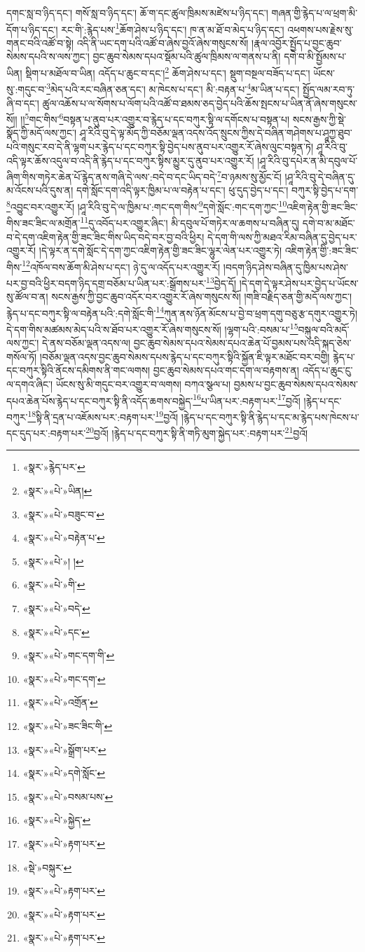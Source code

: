 དགང་སླ་བ་ཉིད་དང་། གསོ་སླ་བ་ཉིད་དང་། ཆོ་ག་དང་ཚུལ་ཁྲིམས་མཛེས་པ་ཉིད་དང་། གཞན་གྱི་རྙེད་པ་ལ་ཕྲག་མི་དོག་པ་ཉིད་དང་། རང་གི་:རྙེད་པས་\footnote{«སྣར་»རྙེད་པར་}ཆོག་ཤེས་པ་ཉིད་དང་། ཁ་ན་མ་ཐོ་བ་མེད་པ་ཉིད་དང་། འཕགས་པས་རྗེས་སུ་གནང་བའི་འཚོ་བ་སྟེ། འདི་ནི་ཡང་དག་པའི་འཚོ་བ་ཞེས་བྱའོ་ཞེས་གསུངས་སོ། །རྣལ་འབྱོར་སྤྱོད་པ་བྱང་ཆུབ་སེམས་དཔའི་ས་ལས་ཀྱང་། བྱང་ཆུབ་སེམས་དཔའ་སྡོམ་པའི་ཚུལ་ཁྲིམས་ལ་གནས་པ་ནི། དགེ་བ་མི་སྤྱོམས་པ་ཡིན། སྡིག་པ་མཐོལ་བ་ཡིན། འདོད་པ་ཆུང་བ་དང་།\footnote{«སྣར་»«པེ་»ཡིན།} ཆོག་ཤེས་པ་དང་། སྡུག་བསྔལ་བཟོད་པ་དང་། ཡོངས་སུ་:གདུང་བ་\footnote{«སྣར་»«པེ་»བཟུང་བ་}མེད་པའི་རང་བཞིན་ཅན་དང་། མ་ཁེངས་པ་དང་། མི་:བརྟན་པ་\footnote{«སྣར་»«པེ་»བརྟེན་པ་}མ་ཡིན་པ་དང་། སྤྱོད་ལམ་རབ་ཏུ་ཞི་བ་དང་། ཚུལ་འཆོས་པ་ལ་སོགས་པ་ལོག་པའི་འཚོ་བ་ཐམས་ཅད་བྱེད་པའི་ཆོས་སྤངས་པ་ཡིན་ནོ་ཞེས་གསུངས་སོ།། །།\footnote{«སྣར་»«པེ་»། །}གང་གིས་\footnote{«སྣར་»«པེ་»གི་}བསྟན་པ་ནུབ་པར་འགྱུར་བ་རྙེད་པ་དང་བཀུར་སྟི་ལ་དགོངས་པ་བསྟན་པ། སངས་རྒྱས་ཀྱི་སྡེ་སྣོད་ཀྱི་མདོ་ལས་ཀྱང་། ཤཱ་རིའི་བུ་དེ་ལྟ་མོད་ཀྱི་བཅོམ་ལྡན་འདས་འོད་སྲུངས་ཀྱིས་དེ་བཞིན་གཤེགས་པ་ཤཱཀྱ་ཐུབ་པའི་གསུང་རབ་དེ་ནི་ལྷག་པར་རྙེད་པ་དང་བཀུར་སྟི་བྱེད་པས་ནུབ་པར་འགྱུར་རོ་ཞེས་ལུང་བསྟན་ཏེ། ཤཱ་རིའི་བུ་འདི་ལྟར་ཆོས་འདུལ་བ་འདི་ནི་རྙེད་པ་དང་བཀུར་སྟིས་མྱུར་དུ་ནུབ་པར་འགྱུར་རོ། །ཤཱ་རིའི་བུ་དཔེར་ན་མི་དབུལ་པོ་ཞིག་གིས་གཏེར་ཆེན་པོ་རྙེད་ནས་གཞི་དེ་ལས་:བདེ་བ་དང་ཡིད་བདེ་\footnote{«སྣར་»«པེ་»བདེ་}བ་ཉམས་སུ་མྱོང་ངོ། །ཤཱ་རིའི་བུ་དེ་བཞིན་དུ་མ་འོངས་པའི་དུས་ན། དགེ་སློང་དག་འདི་ལྟར་ཁྱིམ་པ་ལ་བརྟེན་པ་དང་། ཕུ་དུད་བྱེད་པ་དང་། བཀུར་སྟི་བྱེད་པ་དག་\footnote{«སྣར་»«པེ་»དང་}འབྱུང་བར་འགྱུར་རོ། །ཤཱ་རིའི་བུ་དེ་ལ་ཁྱིམ་པ་:གང་དག་གིས་\footnote{«སྣར་»«པེ་»གང་དག་གི་}དགེ་སློང་:གང་དག་ཀྱང་\footnote{«སྣར་»«པེ་»གང་དག་}འཇིག་རྟེན་གྱི་ཟང་ཟིང་གིས་ཟང་ཟིང་ལ་མགྲོན་\footnote{«སྣར་»«པེ་»འགྲོན་}དུ་འབོད་པར་འགྱུར་ཞིང་། མི་དབུལ་པོ་གཏེར་ལ་ཆགས་པ་བཞིན་དུ། དགེ་བ་མ་མཐོང་བ་དེ་དག་འཇིག་རྟེན་གྱི་ཟང་ཟིང་གིས་ཡིད་བདེ་བར་བྱ་བའི་ཕྱིར། དེ་དག་གི་ལས་ཀྱི་མཐའ་རིམ་བཞིན་དུ་བྱེད་པར་འགྱུར་རོ། །དེ་ལྟར་ན་དགེ་སློང་དེ་དག་ཀྱང་འཇིག་རྟེན་གྱི་ཟང་ཟིང་ལྷུར་ལེན་པར་འགྱུར་ཏེ། འཇིག་རྟེན་གྱི་:ཟང་ཟིང་གིས་\footnote{«སྣར་»«པེ་»ཟང་ཟིང་གི་}འཁོལ་བས་ཆོག་མི་ཤེས་པ་དང་། ཉེ་དུ་ལ་འདོད་པར་འགྱུར་རོ། །བདག་ཉིད་ཤེས་བཞིན་དུ་ཁྱིམ་པས་ཤེས་པར་བྱ་བའི་ཕྱིར་བདག་ཉིད་དགྲ་བཅོམ་པ་ཡིན་པར་:སྒྲོགས་པར་\footnote{«སྣར་»«པེ་»སྒྲོག་པར་}བྱེད་དོ། །དེ་དག་དེ་ལྟར་ཤེས་པར་བྱེད་པ་ཡོངས་སུ་ཚོལ་བ་ན། སངས་རྒྱས་ཀྱི་བྱང་ཆུབ་འདོར་བར་འགྱུར་རོ་ཞེས་གསུངས་སོ། །གཟི་བརྗིད་ཅན་གྱི་མདོ་ལས་ཀྱང་། རྙེད་པ་དང་བཀུར་སྟི་ལ་བརྟེན་པའི་:དགེ་སློང་གི་\footnote{«སྣར་»«པེ་»དགེ་སློང་}ཀུན་ནས་ཉོན་མོངས་པ་བྱེ་བ་ཕྲག་དགུ་བཅུ་རྩ་དགུར་འགྱུར་ཏེ། དེ་དག་གིས་མཚམས་མེད་པའི་ས་ཐོབ་པར་འགྱུར་རོ་ཞེས་གསུངས་སོ། །ལྷག་པའི་:བསམ་པ་\footnote{«སྣར་»«པེ་»བསམ་པས་}བསྐུལ་བའི་མདོ་ལས་ཀྱང་། དེ་ནས་བཅོམ་ལྡན་འདས་ལ། བྱང་ཆུབ་སེམས་དཔའ་སེམས་དཔའ་ཆེན་པོ་བྱམས་པས་འདི་སྐད་ཅེས་གསོལ་ཏོ། །བཅོམ་ལྡན་འདས་བྱང་ཆུབ་སེམས་དཔས་རྙེད་པ་དང་བཀུར་སྟིའི་སྐྱོན་ཇི་ལྟར་མཐོང་བར་བགྱི། རྙེད་པ་དང་བཀུར་སྟིའི་ནོངས་དམིགས་ནི་གང་ལགས། བྱང་ཆུབ་སེམས་དཔའ་གང་དག་ལ་བརྟགས་ན། འདོད་པ་ཆུང་ངུ་ལ་དགའ་ཞིང་། ཡོངས་སུ་མི་གདུང་བར་འགྱུར་བ་ལགས། བཀའ་སྩལ་པ། བྱམས་པ་བྱང་ཆུབ་སེམས་དཔའ་སེམས་དཔའ་ཆེན་པོས་རྙེད་པ་དང་བཀུར་སྟི་ནི་འདོད་ཆགས་བསྐྱེད་\footnote{«སྣར་»«པེ་»སྐྱེད་}པ་ཡིན་པར་:བརྟག་པར་\footnote{«སྣར་»«པེ་»རྟག་པར་}བྱའོ། །རྙེད་པ་དང་བཀུར་\footnote{«སྡེ་»བསྐུར་}སྟི་ནི་དྲན་པ་འཇོམས་པར་:བརྟག་པར་\footnote{«སྣར་»«པེ་»རྟག་པར་}བྱའོ། །རྙེད་པ་དང་བཀུར་སྟི་ནི་རྙེད་པ་དང་མ་རྙེད་པས་ཁེངས་པ་དང་དུད་པར་:བརྟག་པར་\footnote{«སྣར་»«པེ་»རྟག་པར་}བྱའོ། །རྙེད་པ་དང་བཀུར་སྟི་ནི་གཏི་མུག་སྐྱེད་པར་:བརྟག་པར་\footnote{«སྣར་»«པེ་»རྟག་པར་}བྱའོ། 